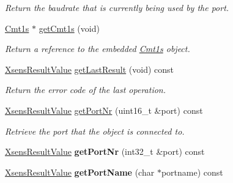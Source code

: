 \begin{DoxyCompactItemize}
\begin{DoxyCompactList}\small\item\em \-Return the baudrate that is currently being used by the port. \end{DoxyCompactList}\item 
\hyperlink{classxsens_1_1Cmt1s}{\-Cmt1s} $\ast$ \hyperlink{classxsens_1_1Cmt2s_ae03ed3faafd335b5b312842b895cc001}{get\-Cmt1s} (void)
\begin{DoxyCompactList}\small\item\em \-Return a reference to the embedded \hyperlink{classxsens_1_1Cmt1s}{\-Cmt1s} object. \end{DoxyCompactList}\item 
\hypertarget{classxsens_1_1Cmt2s_a746070c7d800ff00179c7378b0511ec8}{\hyperlink{group__enums_ga822a2260a20af524029eef9e9a51ff6f}{\-Xsens\-Result\-Value} \hyperlink{classxsens_1_1Cmt2s_a746070c7d800ff00179c7378b0511ec8}{get\-Last\-Result} (void) const }\label{classxsens_1_1Cmt2s_a746070c7d800ff00179c7378b0511ec8}

\begin{DoxyCompactList}\small\item\em \-Return the error code of the last operation. \end{DoxyCompactList}\item 
\hypertarget{classxsens_1_1Cmt2s_a16c0872d8785745fc8a4a648fd7a3c4a}{\hyperlink{group__enums_ga822a2260a20af524029eef9e9a51ff6f}{\-Xsens\-Result\-Value} \hyperlink{classxsens_1_1Cmt2s_a16c0872d8785745fc8a4a648fd7a3c4a}{get\-Port\-Nr} (uint16\-\_\-t \&port) const }\label{classxsens_1_1Cmt2s_a16c0872d8785745fc8a4a648fd7a3c4a}

\begin{DoxyCompactList}\small\item\em \-Retrieve the port that the object is connected to. \end{DoxyCompactList}\item 
\hypertarget{classxsens_1_1Cmt2s_a412a71d1ca8edbfa8d32e91e90960dbb}{\hyperlink{group__enums_ga822a2260a20af524029eef9e9a51ff6f}{\-Xsens\-Result\-Value} {\bfseries get\-Port\-Nr} (int32\-\_\-t \&port) const }\label{classxsens_1_1Cmt2s_a412a71d1ca8edbfa8d32e91e90960dbb}

\item 
\hypertarget{classxsens_1_1Cmt2s_acec7fe49e5273911f8abc81abd22e9bd}{\hyperlink{group__enums_ga822a2260a20af524029eef9e9a51ff6f}{\-Xsens\-Result\-Value} {\bfseries get\-Port\-Name} (char $\ast$portname) const }\label{classxsens_1_1Cmt2s_acec7fe49e5273911f8abc81abd22e9bd}


\end{DoxyCompactItemize}
